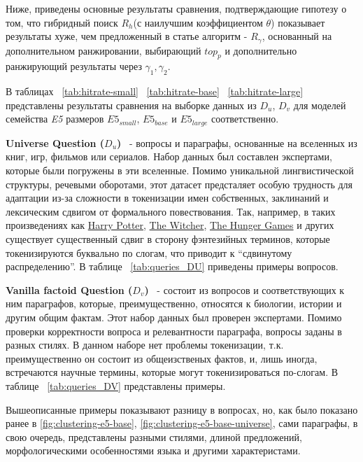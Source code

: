 Ниже, приведены основные результаты сравнения, подтверждающие гипотезу о том, что гибридный поиск $R_h$(с наилучшим коэффициентом $\theta$) 
показывает результаты хуже, чем предложенный в статье алгоритм - $R_{\gamma}$, основанный на дополнительном ранжировании, выбирающий $top_p$ и дополнительно 
ранжирующий результаты через $\gamma_1, \gamma_2$.

В таблицах ~\ref{tab:hitrate-small} ~\ref{tab:hitrate-base} ~\ref{tab:hitrate-large} представлены результаты сравнения на выборке данных из $D_u$, $D_v$ для моделей семейства \textit{E5} \cite{e5} размеров \textit{$E5_{small}$}, \textit{$E5_{ base}$} и \textit{$E5_{large}$} соответственно.




\noindent
\textbf{Universe Question ($D_u$)}~\cite{repojustatom} - вопросы и параграфы, основанные на вселенных из книг, игр, фильмов или сериалов.
Набор данных был составлен экспертами, которые были погружены в эти вселенные. Помимо уникальной лингвистической структуры, речевыми оборотами, 
этот датасет предсталяет особую трудность для адаптации из-за сложности в токенизации имен собственных, заклинаний и лексическим сдвигом от формального повествования. 
Так, например, в таких произведениях как 
\href{https://en.wikipedia.org/wiki/Harry_Potter}{Harry Potter}, 
\href{https://en.wikipedia.org/wiki/The_Witcher}{The Witcher}, 
\href{https://en.wikipedia.org/wiki/The_Hunger_Games}{The Hunger Games} и других 
существует существенный сдвиг в сторону фэнтезийных терминов, которые токенизируются буквально по слогам, что приводит к ``сдвинутому распределению''. В таблице 
~\ref{tab:queries_DU} приведены примеры вопросов.


\noindent
\textbf{Vanilla factoid Question ($D_v$)}~\cite{repojustatom} - состоит из вопросов и соответствующих к ним параграфов, которые, преимущественно, относятся к биологии, истории и другим общим фактам.
Этот набор данных был проверен экспертами. Помимо проверки корректности вопроса и релевантности параграфа, вопросы заданы в разных стилях. В данном наборе нет проблемы токенизации, 
т.к. преимущественно он состоит из общеизственых фактов, и, лишь иногда, встречаются научные термины, которые могут токенизироваться по-слогам. В таблице 
~\ref{tab:queries_DV} представлены примеры.


Вышеописанные примеры показывают разницу в вопросах, но, как было показано ранее в \ref{fig:clustering-e5-base}, \ref{fig:clustering-e5-base-universe}, сами параграфы, в свою очередь, 
представлены разными стилями, длиной предложений, морфологическими особенностями языка и другими характеристами. 

